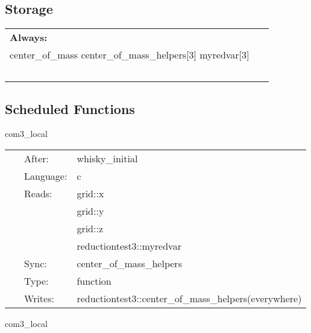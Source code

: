 \subsection*{Storage}

\hspace{5mm}

 \begin{tabular*}{160mm}{ll} 

{\bf Always:}&  ~ \\ 
 center\_of\_mass center\_of\_mass\_helpers[3] myredvar[3] & ~\\ 
~ & ~\\ 
\end{tabular*} 


\subsection*{Scheduled Functions}
\vspace{5mm}


\hspace{5mm} com3\_local 

\hspace{5mm}{\it setup integrands for com calculation } 


\hspace{5mm}

 \begin{tabular*}{160mm}{cll} 
~ & After:  & whisky\_initial \\ 
~ & Language:  & c \\ 
~ & Reads:  & grid::x \\ 
~& ~ &grid::y\\ 
~& ~ &grid::z\\ 
~& ~ &reductiontest3::myredvar\\ 
~ & Sync:  & center\_of\_mass\_helpers \\ 
~ & Type:  & function \\ 
~ & Writes:  & reductiontest3::center\_of\_mass\_helpers(everywhere) \\ 
\end{tabular*} 


\vspace{5mm}


\hspace{5mm} com3\_local 

\hspace{5mm}{\it setup integrands for com calculation } 


